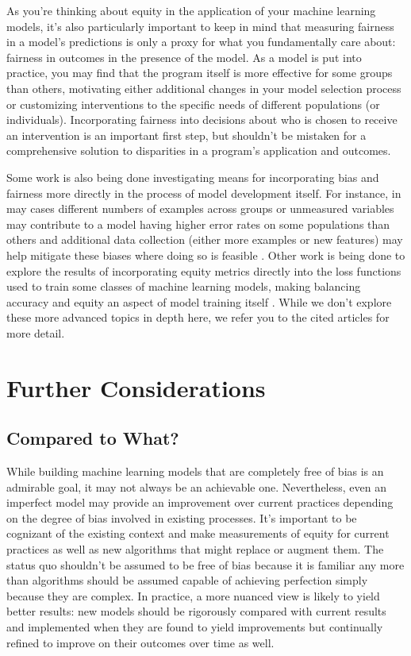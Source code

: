 \documentclass[]{krantz}
\begin{document}
As you're thinking about equity in the application of your machine
learning models, it's also particularly important to keep in mind that
measuring fairness in a model's predictions is only a proxy for what you
fundamentally care about: fairness in outcomes in the presence of the
model. As a model is put into practice, you may find that the program
itself is more effective for some groups than others, motivating either
additional changes in your model selection process or customizing
interventions to the specific needs of different populations (or
individuals). Incorporating fairness into decisions about who is chosen
to receive an intervention is an important first step, but shouldn't be
mistaken for a comprehensive solution to disparities in a program's
application and outcomes.

Some work is also being done investigating means for incorporating bias
and fairness more directly in the process of model development itself.
For instance, in may cases different numbers of examples across groups
or unmeasured variables may contribute to a model having higher error
rates on some populations than others and additional data collection
(either more examples or new features) may help mitigate these biases
where doing so is feasible \citep{chen2018}. Other work is being done to
explore the results of incorporating equity metrics directly into the
loss functions used to train some classes of machine learning models,
making balancing accuracy and equity an aspect of model training itself
\citep{celis2019, zafar2017}. While we don't explore these more advanced
topics in depth here, we refer you to the cited articles for more
detail.

\section{Further Considerations}\label{further-considerations}

\subsection{Compared to What?}\label{compared-to-what}

While building machine learning models that are completely free of bias
is an admirable goal, it may not always be an achievable one.
Nevertheless, even an imperfect model may provide an improvement over
current practices depending on the degree of bias involved in existing
processes. It's important to be cognizant of the existing context and
make measurements of equity for current practices as well as new
algorithms that might replace or augment them. The status quo shouldn't
be assumed to be free of bias because it is familiar any more than
algorithms should be assumed capable of achieving perfection simply
because they are complex. In practice, a more nuanced view is likely to
yield better results: new models should be rigorously compared with
current results and implemented when they are found to yield
improvements but continually refined to improve on their outcomes over
time as well.
\end{document}
